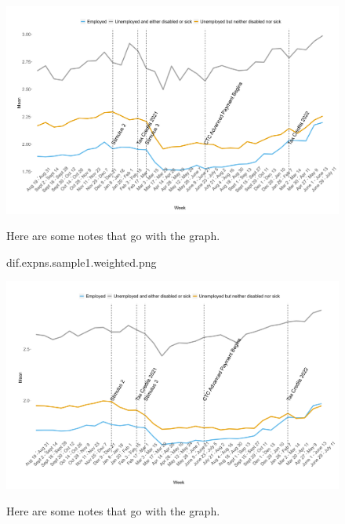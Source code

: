 \documentclass[12pt]{article}
\begin{document}
\begin{figure}[!ht]\label{dif.expns.sample1.weighted.png}
\caption{dif.expns.sample1.weighted.png}
\centering
\includegraphics[scale=0.3]{dif.expns.sample1.weighted.png}
\medskip 
\begin{minipage}{0.65\textwidth} 
{\footnotesize Here are some notes that go with the graph.  \par}
\end{minipage}
\end{figure}

\begin{figure}[!ht]\label{ }
\centering
\includegraphics[scale=0.3]{dif.expns.sample1.unweighted.png}
\medskip 
\begin{minipage}{0.65\textwidth} 
{\footnotesize Here are some notes that go with the graph.  \par}
\end{minipage}
\end{figure}
\end{document}
